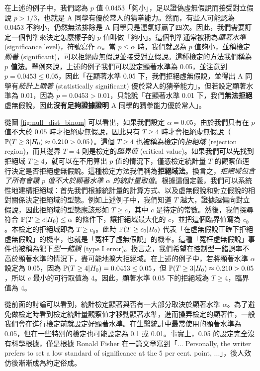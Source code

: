     \medskip

    在上述的例子中，我們認為 $p$ 值 0.0453「夠小」，足以證偽虛無假說而接受對立假說 $p > 1/3$，也就是 A 同學有優於常人的猜拳能力。然而，有些人可能認為 0.0453 不夠小，仍然無法排除是 A 同學只是運氣好贏了四次。因此，我們需要訂定一個判準來決定怎麼樣子的 $p$ 值叫做「夠小」。這個判準通常被稱為\textit{顯著水準} (significance level)，符號寫作 $\alpha$。當 $p \le \alpha$ 時，我們就認為 $p$ 值夠小，並稱檢定\textit{顯著} (significant)，可以拒絕虛無假說並接受對立假說。這種檢定的方法我們稱為 \textbf{$p$ 值法}。舉例來說，上述的例子我們可以設定顯著水準為 0.05，並注意到 $p = 0.0453 \le 0.05$，因此「在顯著水準 0.05 下，我們拒絕虛無假說，並得出 A 同學有\textit{統計上顯著} (statistically significant) 優於常人的猜拳能力」。但若設定顯著水準為 0.01，因為 $p = 0.0453 > 0.01$，只能說「在顯著水準 0.01 下，我們\textbf{無法拒絕}虛無假說，因此\textbf{沒有足夠證據證明} A 同學的猜拳能力優於常人」。

    \medskip

    從圖 \ref{fig:null_dist_binom} 可以看出，如果我們設定 $\alpha = 0.05$，由於我們只有在 $p$ 值不大於 $0.05$ 時才拒絕虛無假說，因此只有 $T \ge 4$ 時才會拒絕虛無假說（$\mathbb{P}(T \ge 3 | H_0) \approx 0.210 > 0.05$）。這個 $T \ge 4$ 也被稱為檢定的\textit{拒絕域} (rejection region)，而其邊界 $T=4$ 則是檢定的\textit{臨界值} (critical value)。如果我們可以先找到拒絕域 $T \ge 4$，就可以在不用算出 $p$ 值的情況下，僅憑檢定統計量 $T$ 的觀察值逕行決定是否拒絕虛無假說。這種檢定方法我們稱為\textbf{拒絕域法}。換言之，\textit{拒絕域包含了所有會讓 $p$ 值不大於顯著水準 $\alpha$ 的統計量取值}。根據這個定義，我們可以系統性地建構拒絕域：首先我們根據統計量的計算方式、以及虛無假說和對立假說的相對關係決定拒絕域的型態。例如上述例子中，我們知道 $T$ 越大，證據越偏向對立假說，因此拒絕域的型態應該形如 $T \ge c$，其中 $c$ 是待定的常數。然後，我們探尋符合 $\mathbb{P}(T \ge c | H_0) \le \alpha$ 的條件下，讓拒絕域最大化的 $c$，並把這個臨界值寫為 $c_0$。本檢定的拒絕域即為 $T \ge c_0$。此時 $\mathbb{P}(T \ge c_0 | H_0)$ 代表「在虛無假說正確下拒絕虛無假說」的機率，也就是「冤枉了虛無假說」的機率。這種「冤枉虛無假說」事件也被稱為犯下\textit{型一錯誤} (type I error)。換言之，我們希望在控制型一錯誤率不高於顯著水準的情況下，盡可能地擴大拒絕域。在上述的例子中，若將顯著水準 $\alpha$ 設定為 0.05，因為 $\mathbb{P}(T \ge 4 | H_0) = 0.0453 \le 0.05$，但 $\mathbb{P}(T \ge 3 | H_0) \approx 0.210 > 0.05$，所以 $c$ 最小的可行取值為 $4$。因此，顯著水準 0.05 下的拒絕域為 $T \ge 4$，臨界值為 $4$。

    \medskip

    從前面的討論可以看到，統計檢定顯著與否有一大部分取決於顯著水準 $\alpha$。為了避免做檢定時看到檢定統計量觀察值才移動顯著水準，進而操弄檢定的顯著性，一般我們會在進行檢定前就設定好顯著水準。在生醫統計中最常使用的顯著水準為 0.05，但在一些特別的檢定也可能設定為 0.1 或 0.01。事實上，0.05 的設定完全沒有科學根據，僅是根據 Ronald Fisher 在一篇文章寫到「... Personally, the writer prefers to set a low standard of significance at the 5 per cent. point, ...」，後人效仿後漸漸成為約定俗成。

